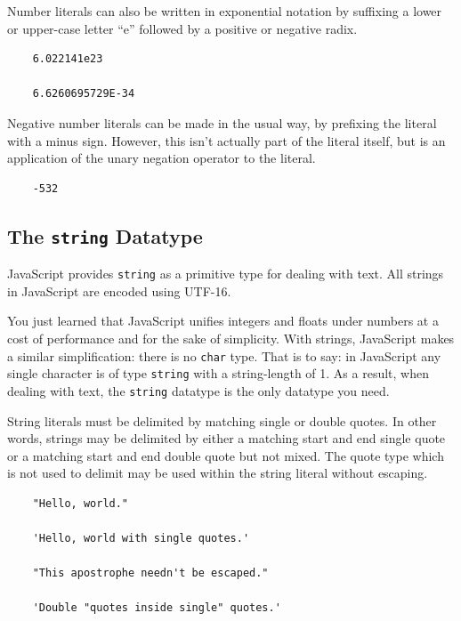 \documentclass[11pt,letter]{book}
\begin{document}
    Number literals can also be written in exponential notation by suffixing a lower or upper-case 
    letter ``e'' followed by a positive or negative radix. 
    
    \begin{verbatim}
    6.022141e23
    
    6.6260695729E-34
    \end{verbatim}
    
    Negative number literals can be made in the usual way, by prefixing the literal with a minus 
    sign. However, this isn't actually part of the literal itself, but is an application of the 
    unary negation operator to the literal.
    
    \begin{verbatim}
    -532
    \end{verbatim}
    
    \subsection{The \texttt{string} Datatype}
    JavaScript provides \texttt{string} as a primitive type for dealing with text. All strings in 
    JavaScript are encoded using UTF-16.
    
    You just learned that JavaScript unifies integers and floats under numbers at a cost of 
    performance and for the sake of simplicity. With strings, JavaScript makes a similar 
    simplification: there is no \texttt{char} type. That is to say: in JavaScript any single 
    character is of type \texttt{string} with a string-length of 1. As a result, when dealing with  
    text, the \texttt{string} datatype is the only datatype you need.
    
    String literals must be delimited by matching single or double quotes. In other words, strings 
    may be delimited by either a matching start and end single quote or a matching start and end 
    double quote but not mixed. The quote type which is not used to delimit may be used within the 
    string literal without escaping.
    
    \begin{verbatim}
    "Hello, world."
    
    'Hello, world with single quotes.'
    
    "This apostrophe needn't be escaped."
    
    'Double "quotes inside single" quotes.'
    \end{verbatim}
    
\end{document}

